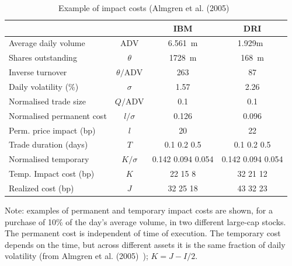         \begin{table}[!ht]
        \caption{Example of impact costs (Almgren et al. (2005)~\cite{athl} \label{tab:costimpact}}
        \begin{tabular}{lccc}
         & & IBM & DRI \\ \hline
        Average daily volume & ADV & 6.561~m & 1.929m~ \\
        Shares outstanding & $\theta$ & 1728~m & 168~m \\
        Inverse turnover & $\theta/\text{ADV}$ & 263 & 87 \\
        Daily volatility (\%) & $\sigma$ &1.57 & 2.26 \\
        Normalised trade size & $Q/\text{ADV}$ & 0.1 & 0.1 \\ \hline
        Normalised permanent cost & $l/\sigma$ & 0.126 & 0.096 \\
        Perm. price impact (bp) & $l$ & 20 & 22 \\ \hline
        Trade duration (days) & $T$ & 0.1 \hspace{0.2cm} 0.2 \hspace{0.2cm} 0.5 & 0.1 \hspace{0.2cm}0.2 \hspace{0.2cm} 0.5 \\
        Normalised temporary & $K/\sigma$ & 0.142 \hspace{0.2cm} 0.094 \hspace{0.2cm}0.054 & 0.142 \hspace{0.2cm} 0.094 \hspace{0.2cm} 0.054 \\
        Temp. Impact cost (bp) & $K$ & 22 \hspace{0.2cm} 15 \hspace{0.2cm} 8 & 32  \hspace{0.2cm}21\hspace{0.2cm} 12 \\ \hline
        Realized cost (bp) & $J$ & 32 \hspace{0.2cm} 25 \hspace{0.2cm} 18 & 43 \hspace{0.2cm}32 \hspace{0.2cm} 23
        \end{tabular}
        {\small Note: examples of permanent and temporary impact costs are shown, for a purchase of 10\% of the day's average volume, in two different large-cap stocks. The permanent cost is independent of time of execution. The temporary cost depends on the time, but across different assets it is the same fraction of daily volatility (from Almgren et al. (2005)~\cite{athl}); $K= J-I/2$.}
        \end{table}


